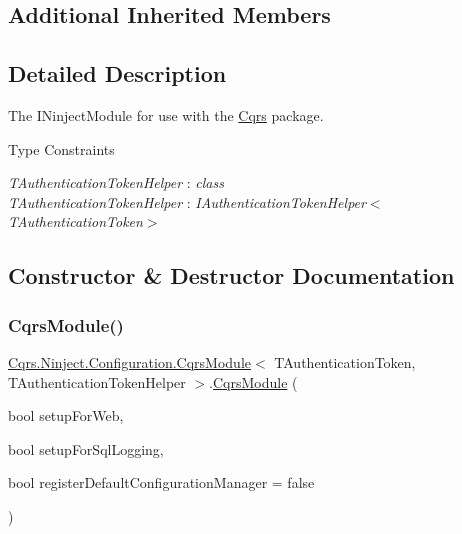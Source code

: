 \subsection*{Additional Inherited Members}


\subsection{Detailed Description}
The I\+Ninject\+Module for use with the \hyperlink{namespaceCqrs}{Cqrs} package. 

\begin{Desc}
\item[Type Constraints]\begin{description}
\item[{\em T\+Authentication\+Token\+Helper} : {\em class}]\item[{\em T\+Authentication\+Token\+Helper} : {\em I\+Authentication\+Token\+Helper$<$T\+Authentication\+Token$>$}]\end{description}
\end{Desc}


\subsection{Constructor \& Destructor Documentation}
\mbox{\label{classCqrs_1_1Ninject_1_1Configuration_1_1CqrsModule_a197055fca498bff31fd9a91a2a07292d_a197055fca498bff31fd9a91a2a07292d}} 
\subsubsection{\texorpdfstring{Cqrs\+Module()}{CqrsModule()}}
{\footnotesize\ttfamily \hyperlink{classCqrs_1_1Ninject_1_1Configuration_1_1CqrsModule}{Cqrs.\+Ninject.\+Configuration.\+Cqrs\+Module}$<$ T\+Authentication\+Token, T\+Authentication\+Token\+Helper $>$.\hyperlink{classCqrs_1_1Ninject_1_1Configuration_1_1CqrsModule}{Cqrs\+Module} (\begin{DoxyParamCaption}\item[{bool}]{setup\+For\+Web,  }\item[{bool}]{setup\+For\+Sql\+Logging,  }\item[{bool}]{register\+Default\+Configuration\+Manager = {\ttfamily false} }\end{DoxyParamCaption})}


